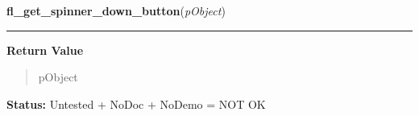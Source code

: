     \vspace{0.5ex}

\hspace{.8\funcindent}\begin{boxedminipage}{\funcwidth}

    \raggedright \textbf{fl\_get\_spinner\_down\_button}(\textit{pObject})

    \vspace{-1.5ex}

    \rule{\textwidth}{0.5\fboxrule}
\setlength{\parskip}{2ex}
\setlength{\parskip}{1ex}
      \textbf{Return Value}
    \vspace{-1ex}

      \begin{quote}
      pObject

      \end{quote}

\textbf{Status:} Untested + NoDoc + NoDemo = NOT OK



    \end{boxedminipage}

    \label{xformslib:library:fl_add_tabfolder}

    \vspace{0.5ex}

